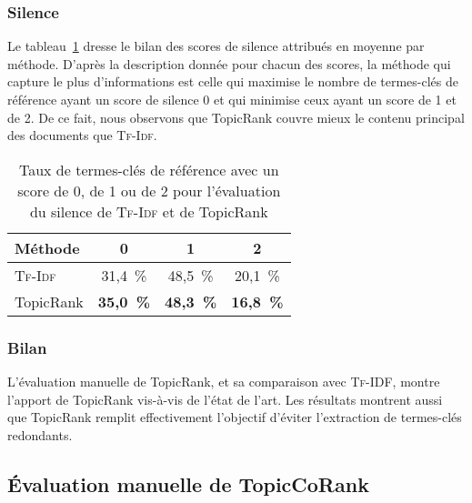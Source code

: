       \subsubsection{Silence}
      \label{subsubsec:main-automatic_evaluation_of_keyphrase_annotation-results-topicrank-silence}
        Le
        tableau~\ref{tab:main-automatic_evaluation_of_keyphrase_annotation-results-topicrank-silence_score_ratio}
        dresse le bilan des scores de silence attribués en moyenne par méthode.
        D'après la description donnée pour chacun des scores, la méthode qui
        capture le plus d'informations est celle qui maximise le nombre de
        termes-clés de référence ayant un score de silence 0 et qui minimise
        ceux ayant un score de 1 et de 2. De ce fait, nous observons que
        TopicRank couvre mieux le contenu principal des documents que
        \textsc{Tf-Idf}.
        \begin{table}[h!]
          \centering
          \begin{tabular}{l|c|c|c}
            \toprule
            \textbf{Méthode} & \textbf{0} & \textbf{1} & \textbf{2}\\
            \hline
            \textsc{Tf-Idf} & 31,4~\% & 48,5~\% & 20,1~\%\\
            TopicRank & \textbf{35,0~\%} & \textbf{48,3~\%} & \textbf{16,8~\%}\\
            \bottomrule
          \end{tabular}
          \caption{Taux de termes-clés de référence avec un score de 0, de 1 ou
                   de 2 pour l'évaluation du silence de \textsc{Tf-Idf} et de
                   TopicRank
                   \label{tab:main-automatic_evaluation_of_keyphrase_annotation-results-topicrank-silence_score_ratio}}
        \end{table}
    
      \subsubsection{Bilan}
      \label{subsubsec:main-automatic_evaluation_of_keyphrase_annotation-results-topicrank-conclusion}
        L'évaluation manuelle de TopicRank, et sa comparaison avec
        \textsc{Tf-IDF}, montre l'apport de TopicRank vis-à-vis de l'état de
        l'art. Les résultats montrent aussi que TopicRank remplit effectivement
        l'objectif d'éviter l'extraction de termes-clés redondants.

    \subsection{Évaluation manuelle de TopicCoRank}
    \label{subsec:main-automatic_evaluation_of_keyphrase_annotation-results-topiccorank}

